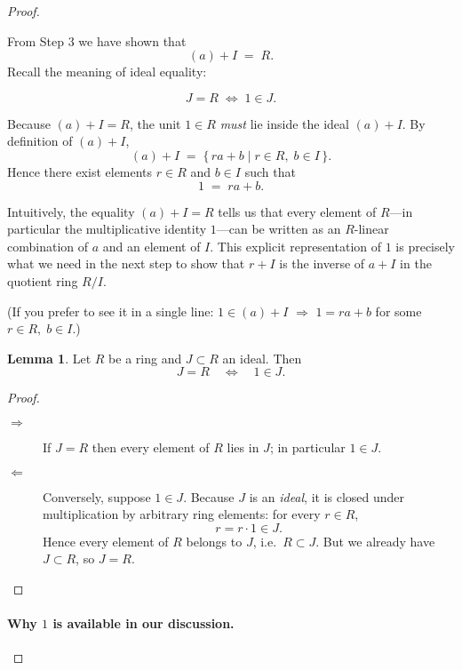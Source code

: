 \documentclass[12pt]{article}
\theoremstyle{definition} %
\newtheorem{lemma}{Lemma}
\theoremstyle{plain} %
\begin{document}
\begin{proof}
\begin{enumerate}
From Step 3 we have shown that 
\[
  (a)+I \;=\; R .
\]
Recall the meaning of ideal equality:

\[
  J = R 
  \;\Longleftrightarrow\; 
  1 \in J .
\]

Because \((a)+I = R\), the unit \(1\in R\) \emph{must} lie inside the ideal \((a)+I\).
By definition of \((a)+I\),
\[
  (a)+I 
  \;=\; 
  \{\, ra + b \mid r\in R,\; b\in I \,\}.
\]
Hence there exist elements \(r\in R\) and \(b\in I\) such that
\[
  1 \;=\; ra + b .
\]

Intuitively, the equality \((a)+I = R\) tells us that every element of \(R\)—in particular the multiplicative identity \(1\)—can be written as an \(R\!\)-linear combination of \(a\) and an element of \(I\).  This explicit representation of \(1\) is precisely what we need in the next step to show that \(r+I\) is the inverse of \(a+I\) in the quotient ring \(R/I\).

(If you prefer to see it in a single line: \(1\in(a)+I\) \(\Longrightarrow\) \(1=ra+b\) for some \(r\in R,\; b\in I\).)
\begin{lemma}
  Let \(R\) be a ring and \(J\subset R\) an ideal.  
  Then
  \[
      J = R \quad\Longleftrightarrow\quad 1\in J .
  \]
\end{lemma}

\begin{proof}
  \begin{description}
    \item[\(\boldsymbol{\Rightarrow}\)]  
      If \(J = R\) then every element of \(R\) lies in \(J\); in particular \(1\in J\).

    \item[\(\boldsymbol{\Leftarrow}\)]  
      Conversely, suppose \(1\in J\).  
      Because \(J\) is an \emph{ideal}, it is closed under multiplication by arbitrary ring
      elements: for every \(r\in R\),
      \[
        r = r\cdot 1 \in J .
      \]
      Hence every element of \(R\) belongs to \(J\), i.e.\ \(R\subset J\).
      But we already have \(J\subset R\), so \(J = R\).
  \end{description}
\end{proof}
\paragraph*{Why \(1\) is available in our discussion.}


\end{enumerate}
\end{proof}
\end{document}
